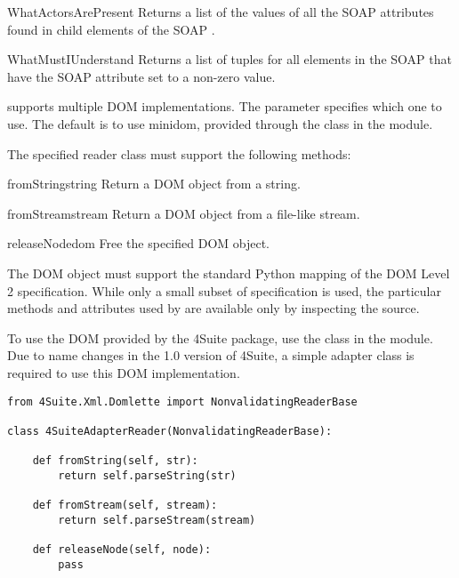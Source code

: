 \begin{methoddesc}{WhatActorsArePresent}{}
Returns a list of the values of all the SOAP  attributes
found in child elements of the SOAP .
\end{methoddesc}

\begin{methoddesc}{WhatMustIUnderstand}{}
Returns a list of  tuples for all elements in the
SOAP  that have the SOAP  attribute set
to a non-zero value.
\end{methoddesc}

\ZSI{} supports multiple DOM implementations.
The  parameter specifies which one to use.
The default is to use minidom, provided through the  class
in the  module.

The specified reader class must support the following methods:

\begin{methoddesc}{fromString}{string}
Return a DOM object from a string.
\end{methoddesc}

\begin{methoddesc}{fromStream}{stream}
Return a DOM object from a file-like stream.
\end{methoddesc}

\begin{methoddesc}{releaseNode}{dom}
Free the specified DOM object.
\end{methoddesc}

The DOM object must support the standard Python mapping of the DOM Level 2
specification.
While only a small subset of specification is used, the particular
methods and attributes used by \ZSI{} are available only
by inspecting the source.

To use the  DOM provided by the 4Suite package, use the
 class in the  module.
Due to name changes in the 1.0 version of 4Suite, a simple adapter class
is required to use this DOM implementation. 

\begin{verbatim}
from 4Suite.Xml.Domlette import NonvalidatingReaderBase

class 4SuiteAdapterReader(NonvalidatingReaderBase):

    def fromString(self, str):
        return self.parseString(str)

    def fromStream(self, stream):
        return self.parseStream(stream)

    def releaseNode(self, node):
        pass
\end{verbatim}

